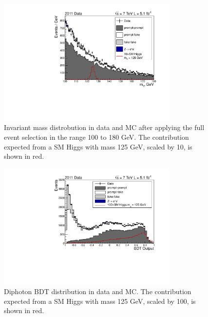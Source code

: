 \begin{figure}[hbt!]
  \includegraphics[width=0.8\textwidth]{hgg7TeV/variablePlots/mass}
 \caption{Invariant mass distrobution in data and MC after applying the full event selection in the
 range 100 to 180 GeV. The contribution expected from a SM Higgs with mass 125 GeV, scaled by 10, 
 is shown in red. }
 \label{fig:massmcdata}
\end{figure}
\begin{figure}[hbt!]
 \includegraphics[width=0.8\textwidth]{hgg7TeV/variablePlots/bdtoutput}
 \caption{Diphoton BDT distribution in data and MC. The contribution expected from a SM Higgs with mass 125 GeV, 
 scaled by 100, is shown in red. }
 \label{fig:diphotonBDT}
\end{figure}

